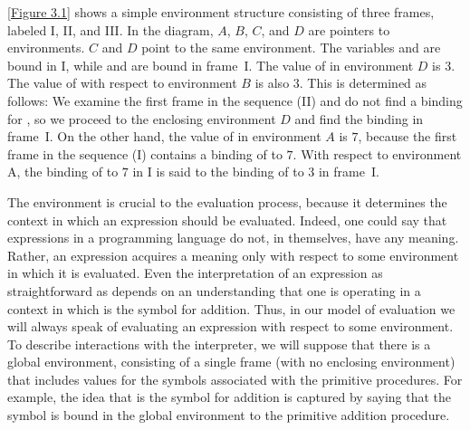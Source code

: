 \cref{Figure 3.1} shows a simple environment structure consisting of three frames, labeled I, II, and III.
In the diagram, \( A \), \( B \), \( C \), and \( D \) are pointers to environments.
\( C \) and \( D \) point to the same environment.
The variables  and  are bound in I, while  and  are bound in frame I.
The value of  in environment \( D \) is \( 3 \).
The value of  with respect to environment \( B \) is also \( 3 \).
This is determined as follows:
We examine the first frame in the sequence (II) and do not find a binding for , so we proceed to the enclosing environment \( D \) and find the binding in frame I.
On the other hand, the value of  in environment \( A \) is \( 7 \), because the first frame in the sequence (I) contains a binding of  to \( 7 \).
With respect to environment A, the binding of  to \( 7 \) in I is said to  the binding of  to \( 3 \) in frame I.

The environment is crucial to the evaluation process, because it determines the context in which an expression should be evaluated.
Indeed, one could say that expressions in a programming language do not, in themselves, have any meaning.
Rather, an expression acquires a meaning only with respect to some environment in which it is evaluated.
Even the interpretation of an expression as straightforward as  depends on an understanding that one is operating in a context in which \code{+} is the symbol for addition.
Thus, in our model of evaluation we will always speak of evaluating an expression with respect to some environment.
To describe interactions with the interpreter, we will suppose that there is a global environment, consisting of a single frame (with no enclosing environment) that includes values for the symbols associated with the primitive procedures.
For example, the idea that \code{+} is the symbol for addition is captured by saying that the symbol \code{+} is bound in the global environment to the primitive addition procedure.





